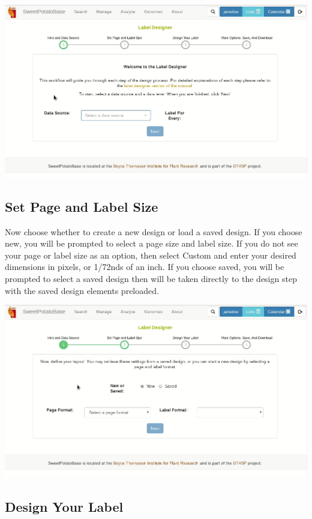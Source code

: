 \documentclass[
  12pt,
]{book}
\begin{document}
\begin{center}\includegraphics[width=0.95\linewidth]{assets/gifs/gif1} \end{center}

\hypertarget{set-page-and-label-size}{%
\subsection{Set Page and Label Size}\label{set-page-and-label-size}}

Now choose whether to create a new design or load a saved design. If you choose new, you will be prompted to select a page size and label size. If you do not see your page or label size as an option, then select Custom and enter your desired dimensions in pixels, or 1/72nds of an inch. If you choose saved, you will be prompted to select a saved design then will be taken directly to the design step with the saved design elements preloaded.

\begin{center}\includegraphics[width=0.95\linewidth]{assets/gifs/gif2} \end{center}

\hypertarget{design-your-label}{%
\subsection{Design Your Label}\label{design-your-label}}
\end{document}
